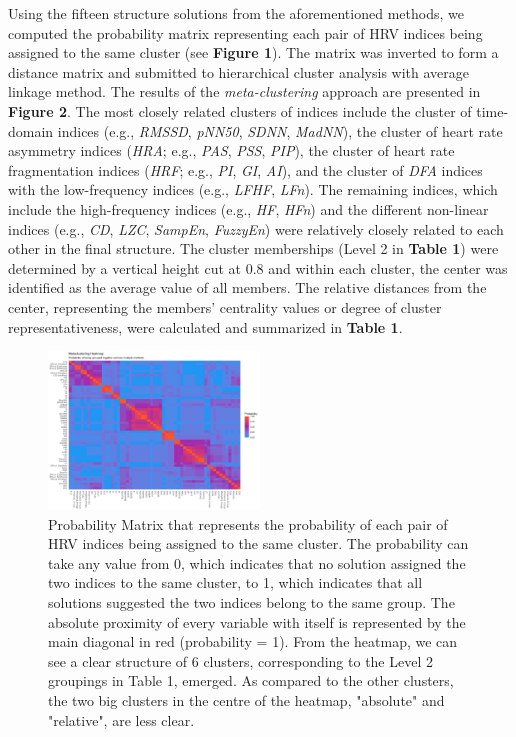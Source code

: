\documentclass[
  english,
  jou,floatsintext]{apa6}
\begin{document}
Using the fifteen structure solutions from the aforementioned methods, we computed the probability matrix representing each pair of HRV indices being assigned to the same cluster (see \textbf{Figure 1}). The matrix was inverted to form a distance matrix and submitted to hierarchical cluster analysis with average linkage method. The results of the \emph{meta-clustering} approach are presented in \textbf{Figure 2}. The most closely related clusters of indices include the cluster of time-domain indices (e.g., \emph{RMSSD}, \emph{pNN50}, \emph{SDNN}, \emph{MadNN}), the cluster of heart rate asymmetry indices (\emph{HRA}; e.g., \emph{PAS}, \emph{PSS}, \emph{PIP}), the cluster of heart rate fragmentation indices (\emph{HRF}; e.g., \emph{PI}, \emph{GI}, \emph{AI}), and the cluster of \emph{DFA} indices with the low-frequency indices (e.g., \emph{LFHF}, \emph{LFn}). The remaining indices, which include the high-frequency indices (e.g., \emph{HF}, \emph{HFn}) and the different non-linear indices (e.g., \emph{CD}, \emph{LZC}, \emph{SampEn}, \emph{FuzzyEn}) were relatively closely related to each other in the final structure. The cluster memberships (Level 2 in \textbf{Table 1}) were determined by a vertical height cut at 0.8 and within each cluster, the center was identified as the average value of all members. The relative distances from the center, representing the members' centrality values or degree of cluster representativeness, were calculated and summarized in \textbf{Table 1}.

\begin{figure}

{\centering \includegraphics[width=0.5\textwidth]{figures/figure_probability_matrix} 

}

\caption{Probability Matrix that represents the probability of each pair of HRV indices being assigned to the same cluster. The probability can take any value from 0, which indicates that no solution assigned the two indices to the same cluster, to 1, which indicates that all solutions suggested the two indices belong to the same group. The absolute proximity of every variable with itself is represented by the main diagonal in red (probability = 1). From the heatmap, we can see a clear structure of 6 clusters, corresponding to the Level 2 groupings in Table 1, emerged. As compared to the other clusters, the two big clusters in the centre of the heatmap, "absolute" and "relative", are less clear.}\label{fig:Figure1}
\end{figure}
\end{document}
